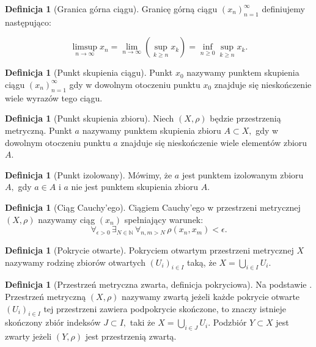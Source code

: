 \documentclass[licencjacka]{pwr_wmat_praca_dyplomowa}
\theoremstyle{plain}
\numberwithin{theorem}{chapter}
\theoremstyle{definition}
\numberwithin{theorem}{chapter}
\newtheorem{definition}[theorem]{Definicja}
\begin{document}
\begin{definition}[Granica górna ciągu]
Granicę górną ciągu $(x_n)_{n=1}^\infty$ definiujemy następująco:

$$\limsup_{n \rightarrow \infty} x_n = \lim_{n \rightarrow \infty} \left(\sup_{k \geq n} x_k\right) = \inf_{n \geq 0} \sup_{k \geq n} x_k.$$
\end{definition}

\begin{definition}[Punkt skupienia ciągu]
Punkt $x_0$ nazywamy punktem skupienia ciągu $(x_n)_{n=1}^{\infty}$ gdy w dowolnym otoczeniu punktu $x_0$ znajduje się nieskończenie wiele wyrazów tego ciągu.
\end{definition}

\begin{definition}[Punkt skupienia zbioru]
Niech $(X, \rho)$ będzie przestrzenią metryczną.
Punkt $a$ nazywamy punktem skupienia zbioru $A \subset X,$ gdy w dowolnym otoczeniu punktu $a$ znajduje się nieskończenie wiele elementów zbioru $A$.
\end{definition}

\begin{definition}[Punkt izolowany]
Mówimy, że $a$ jest punktem izolowanym zbioru $A,$ gdy $a \in A$ i $a$ nie jest punktem skupienia zbioru $A.$
\end{definition}


\begin{definition}[Ciąg Cauchy'ego]
Ciągiem Cauchy'ego w przestrzeni metrycznej $(X, \rho)$ nazywamy ciąg $(x_n)$ spełniający warunek:
$$\forall_{\epsilon>0} \, \exists_{N \in \mathbb{N}} \, \forall_{n,m > N} \, \rho(x_n, x_m) < \epsilon.$$
\end{definition}



\begin{definition}[Pokrycie otwarte]
\cite[s.~195]{ruette2017chaos}
Pokryciem otwartym przestrzeni metrycznej $X$ nazywamy rodzinę zbiorów otwartych $(U_i)_{i \in I}$ taką, że $X=\bigcup_{i \in I}U_i$.
\end{definition}

\begin{definition}[Przestrzeń metryczna zwarta, definicja pokryciowa]
Na podstawie \cite[s.~196]{ruette2017chaos}.
Przestrzeń metryczną $(X, \rho)$ nazywamy zwartą jeżeli każde pokrycie otwarte $(U_i)_{i \in I}$ tej przestrzeni zawiera podpokrycie skończone, to znaczy istnieje skończony zbiór indeksów $J \subset I,$ taki że $X = \bigcup_{i \in J}U_i$.
Podzbiór $Y \subset X$ jest zwarty jeżeli $(Y, \rho)$ jest przestrzenią zwartą.
\end{definition}
\end{document}
